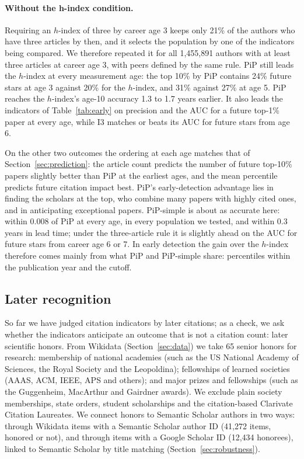 \documentclass[11pt]{article}
\begin{document}
\paragraph{Without the h-index condition.} Requiring an $h$-index of three by career age 3 keeps only 21\% of the
authors who have three articles by then, and it selects the population by one of the indicators being compared. We
therefore repeated it for all 1,455,891 authors with at least three articles at career age 3, with peers defined by the
same rule. PiP still leads the $h$-index at every measurement age: the top 10\% by PiP contains 24\% future stars at age
3 against 20\% for the $h$-index, and 31\% against 27\% at age 5. PiP reaches the $h$-index's age-10 accuracy 1.3 to 1.7
years earlier. It also leads the indicators of Table~\ref{tab:early} on precision and the AUC for a future top-1\% paper
at every age, while I3 matches or beats its AUC for future stars from age 6.

On the other two outcomes the ordering at each age matches that of Section~\ref{sec:prediction}: the article count
predicts the number of future top-10\% papers slightly better than PiP at the earliest ages, and the mean percentile
predicts future citation impact best. PiP's early-detection advantage lies in finding the scholars at the top, who
combine many papers with highly cited ones, and in anticipating exceptional papers. PiP-simple is about as accurate
here: within 0.008 of PiP at every age, in every population we tested, and within 0.3 years in lead time; under the
three-article rule it is slightly ahead on the AUC for future stars from career age 6 or 7. In early detection the gain
over the $h$-index therefore comes mainly from what PiP and PiP-simple share: percentiles within the publication year
and the cutoff.
\subsection{Later recognition}
\label{sec:honors}

So far we have judged citation indicators by later citations; as a check, we ask whether the indicators anticipate an
outcome that is not a citation count: later scientific honors. From Wikidata (Section~\ref{sec:data}) we take 65 senior
honors for research: membership of national academies (such as the US National Academy of Sciences, the Royal Society
and the Leopoldina); fellowships of learned societies (AAAS, ACM, IEEE, APS and others); and major prizes and
fellowships (such as the Guggenheim, MacArthur and Gairdner awards). We exclude plain society memberships, state orders,
student scholarships and the citation-based Clarivate Citation Laureates. We connect honors to Semantic Scholar authors
in two ways: through Wikidata items with a Semantic Scholar author ID (41,272 items, honored or not), and through items
with a Google Scholar ID (12,434 honorees), linked to Semantic Scholar by title matching (Section~\ref{sec:robustness}).
\end{document}
